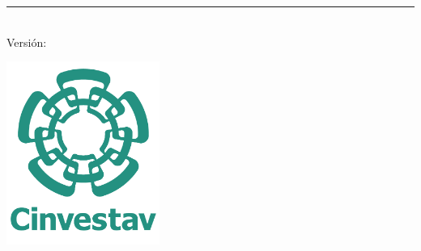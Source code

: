 %
\begin{titlepage}
	\flushright
	\hfill
	\vfill
	{\LARGE\thesisTitle \par}
	\rule[5pt]{\textwidth}{.4pt} \par
	{\Large\thesisName}
	\vfill
	\textit{\large\thesisDate} \\
	Versión: \thesisVersion
\end{titlepage}


\begin{titlepage}
	\tgherosfont
	\centering

	\includegraphics[width=5cm]{gfx/logospng1.png} \\[2mm]
	{\LARGE \thesisUniversity} \\[2mm]
	\Large{\thesisUniversityDepartment} \\[4mm]


\end{titlepage}

